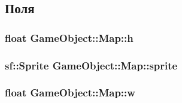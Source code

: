 \subsection{Поля}
\subsubsection[{\texorpdfstring{h}{h}}]{\setlength{\rightskip}{0pt plus 5cm}float Game\+Object\+::\+Map\+::h}\hypertarget{classGameObject_1_1Map_a7671d57b12b426d1b8a7bb9e939d6817}{}\label{classGameObject_1_1Map_a7671d57b12b426d1b8a7bb9e939d6817}
\subsubsection[{\texorpdfstring{sprite}{sprite}}]{\setlength{\rightskip}{0pt plus 5cm}sf\+::\+Sprite Game\+Object\+::\+Map\+::sprite}\hypertarget{classGameObject_1_1Map_a94d4bf5f7fb90c227b9a8353914444e1}{}\label{classGameObject_1_1Map_a94d4bf5f7fb90c227b9a8353914444e1}
\subsubsection[{\texorpdfstring{w}{w}}]{\setlength{\rightskip}{0pt plus 5cm}float Game\+Object\+::\+Map\+::w}\hypertarget{classGameObject_1_1Map_a3bfda345ad076b54022f9ff5ec372060}{}\label{classGameObject_1_1Map_a3bfda345ad076b54022f9ff5ec372060}
